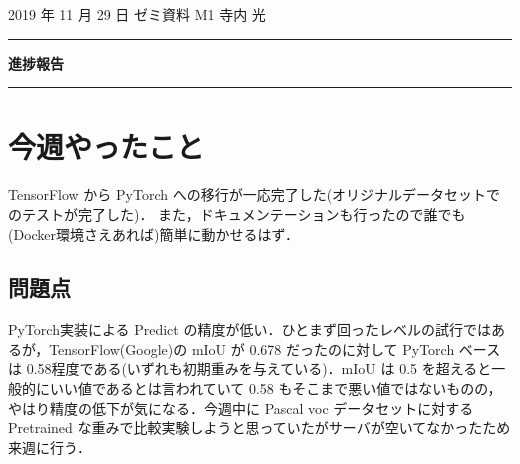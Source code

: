 \documentclass[onecolumn]{ujarticle}   %
\begin{document}
	\noindent

	\hspace{1em}
	2019 年 11 月 29 日
	ゼミ資料
	\hfill
	M1 寺内 光

	\vspace{2mm}

	\hrule

	\begin{center}
		{\Large \bf 進捗報告}
	\end{center}


	\hrule
	\vspace{3mm}

	\section{今週やったこと}
	TensorFlow から PyTorch への移行が一応完了した(オリジナルデータセットでのテストが完了した)．
	また，ドキュメンテーションも行ったので誰でも(Docker環境さえあれば)簡単に動かせるはず．

	\subsection{問題点}
	PyTorch実装による Predict の精度が低い．ひとまず回ったレベルの試行ではあるが，TensorFlow(Google)の mIoU が 0.678 だったのに対して PyTorch ベースは 0.58程度である(いずれも初期重みを与えている)．mIoU は 0.5 を超えると一般的にいい値であるとは言われていて 0.58 もそこまで悪い値ではないものの，やはり精度の低下が気になる．今週中に Pascal voc データセットに対する Pretrained な重みで比較実験しようと思っていたがサーバが空いてなかったため来週に行う．
\end{document}
